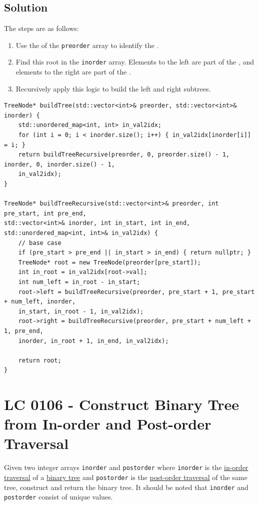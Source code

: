 \subsection*{Solution}
The steps are as follows:
\begin{enumerate}
	\item Use the {\color{blue}{first element}} of the {\colorbox{CodeBackground}{\lstinline|preorder|}} array to identify the {\color{blue}{root}}.
	\item Find this root in the {\colorbox{CodeBackground}{\lstinline|inorder|}} array. Elements to the left are part of the {\color{blue}{left subtree}}, and elements to the right are part of the {\color{blue}{right subtree}}.
	\item Recursively apply this logic to build the left and right subtrees.
\end{enumerate}
\begin{lstlisting}
TreeNode* buildTree(std::vector<int>& preorder, std::vector<int>& inorder) {
	std::unordered_map<int, int> in_val2idx;
	for (int i = 0; i < inorder.size(); i++) { in_val2idx[inorder[i]] = i; }
	return buildTreeRecursive(preorder, 0, preorder.size() - 1, inorder, 0, inorder.size() - 1,
	in_val2idx);
}

TreeNode* buildTreeRecursive(std::vector<int>& preorder, int pre_start, int pre_end,
std::vector<int>& inorder, int in_start, int in_end,
std::unordered_map<int, int>& in_val2idx) {
	// base case
	if (pre_start > pre_end || in_start > in_end) { return nullptr; }
	TreeNode* root = new TreeNode(preorder[pre_start]);
	int in_root = in_val2idx[root->val];
	int num_left = in_root - in_start;
	root->left = buildTreeRecursive(preorder, pre_start + 1, pre_start + num_left, inorder, 
	in_start, in_root - 1, in_val2idx);
	root->right = buildTreeRecursive(preorder, pre_start + num_left + 1, pre_end, 
	inorder, in_root + 1, in_end, in_val2idx);
	
	return root;
}
\end{lstlisting}

\section{LC 0106 - Construct Binary Tree from In-order and Post-order Traversal}
Given two integer arrays {\colorbox{CodeBackground}{\lstinline|inorder|}} and {\colorbox{CodeBackground}{\lstinline|postorder|}} where {\colorbox{CodeBackground}{\lstinline|inorder|}} is the \ul{in-order traversal} of a \ul{binary tree} and {\colorbox{CodeBackground}{\lstinline|postorder|}} is the \ul{post-order traversal} of the same tree, construct and return the binary tree. It should be noted that {\colorbox{CodeBackground}{\lstinline|inorder|}} and {\colorbox{CodeBackground}{\lstinline|postorder|}} consist of unique values.  \\

